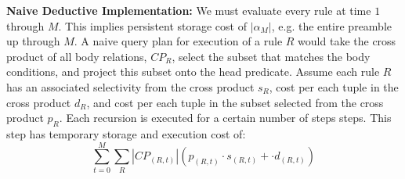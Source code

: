 %
%
{\bf Naive Deductive Implementation: } We must evaluate every rule at time $1$
through $M$.  This implies persistent storage cost of $|\alpha_M|$, e.g. the
entire preamble up through $M$.
A naive query plan for execution of a rule $R$ would take the cross product of
all body relations, $CP_R$, select the subset that matches the body conditions,
and project this subset onto the head predicate.  Assume each rule $R$ has an
associated selectivity from the cross product $s_R$, cost per each tuple in the
cross product $d_R$, and cost per each tuple in the subset selected from the
cross product $p_R$.  Each recursion is executed for a certain number of steps
steps.  This step has temporary storage and execution cost of:
%
\[ \sum_{t=0}^M \sum_{R} |CP_{(R,t)}|(p_{(R,t)} \cdot s_{(R,t)} + \cdot
d_{(R,t)}) \]
%







%

